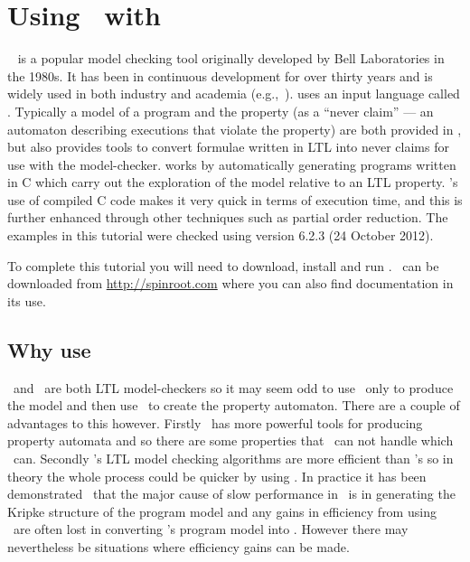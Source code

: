 \section{Using \ajpf\ with \spin}

\begin{sloppypar}
\spin{}~\cite{holzmann04spin} is a popular model checking tool
originally developed by Bell Laboratories in the 1980s.  It has been
in continuous development for over thirty years and is widely used in
both industry and academia
(e.g.,~\cite{havelund00formal,kars96application,kirsch11technical}).
\spin{} uses an input language called \promela{}.  Typically a model
of a program and the property (as a ``never claim'' --- an automaton
describing executions that violate the property) are both provided in
\promela{}, but \spin{} also provides tools to convert formulae
written in LTL into never claims for use with the
model-checker. \spin{} works by automatically generating programs
written in C which carry out the exploration of the model relative to
an LTL property. \spin{}'s use of compiled C code makes it very quick
in terms of execution time, and this is further enhanced through other
techniques such as partial order reduction. The examples in this tutorial were checked using \spin{} version 6.2.3 (24 October 2012).
\end{sloppypar}

To complete this tutorial you will need to download, install and run \spin{}.  \spin\ can be downloaded from \url{http://spinroot.com} where you can also find documentation in its use.

\subsection{Why use \spin{}}

\spin\ and \ajpf\ are both LTL model-checkers so it may seem odd to use \ajpf\ only to produce the model and then use \spin\ to create the property automaton.  There are a couple of advantages to this however.  Firstly \spin\ has more powerful tools for producing property automata and so there are some properties that \ajpf\ can not handle which \spin\ can.  Secondly \spin's LTL model checking algorithms are more efficient than \ajpf's so in theory the whole process could be quicker by using \spin.  In practice it has been demonstrated~\cite{dennis15:_two} that the major cause of slow performance in \ajpf\ is in generating the Kripke structure of the program model and any gains in efficiency from using \spin\ are often lost in converting \ajpf's program model into \promela{}.  However there may  nevertheless be situations where efficiency gains can be made.  

